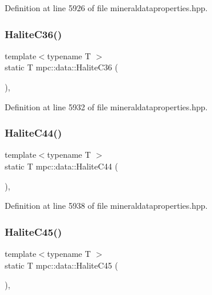 Definition at line 5926 of file mineraldataproperties.\+hpp.

\mbox{\label{namespacempc_1_1data_a051aa7fdc8397d4b6ec7bcb5df2040af}} 
\subsubsection{\texorpdfstring{Halite\+C36()}{HaliteC36()}}
{\footnotesize\ttfamily template$<$typename T $>$ \\
static T mpc\+::data\+::\+Halite\+C36 (\begin{DoxyParamCaption}{ }\end{DoxyParamCaption})\hspace{0.3cm}{\ttfamily [inline]}, {\ttfamily [static]}}



Definition at line 5932 of file mineraldataproperties.\+hpp.

\mbox{\label{namespacempc_1_1data_a52fafc4fc57a56dfb67449334d667a81}} 
\subsubsection{\texorpdfstring{Halite\+C44()}{HaliteC44()}}
{\footnotesize\ttfamily template$<$typename T $>$ \\
static T mpc\+::data\+::\+Halite\+C44 (\begin{DoxyParamCaption}{ }\end{DoxyParamCaption})\hspace{0.3cm}{\ttfamily [inline]}, {\ttfamily [static]}}



Definition at line 5938 of file mineraldataproperties.\+hpp.

\mbox{\label{namespacempc_1_1data_a13923fb11143d867b1cbebddb53da163}} 
\subsubsection{\texorpdfstring{Halite\+C45()}{HaliteC45()}}
{\footnotesize\ttfamily template$<$typename T $>$ \\
static T mpc\+::data\+::\+Halite\+C45 (\begin{DoxyParamCaption}{ }\end{DoxyParamCaption})\hspace{0.3cm}{\ttfamily [inline]}, {\ttfamily [static]}}



